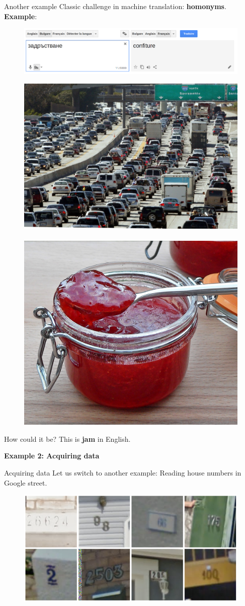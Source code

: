 \documentclass{beamer}
\begin{document}
\begin{frame}{Another example}
Classic challenge in machine translation: \textbf{homonyms}.
\vfill
\pause
\textbf{Example}:
\pause
\vfill
\begin{figure}
\centering
\includegraphics[width=\textwidth]{images/jam_google_translate.png}
\end{figure}
\pause
\vfill
\begin{figure}
\centering
\includegraphics[width=.45\textwidth]{images/traffic_jam.jpeg}~
\includegraphics[width=.4\textwidth]{images/jam.jpg}
\end{figure}
\pause
\vfill
How could it be? \pause This is \textbf{jam} in English.
\end{frame}

\begin{frame}
\center
\Huge
\textbf{Example 2: Acquiring data}
\end{frame}

\begin{frame}{Acquiring data}
Let us switch to another example: \pause Reading house numbers in Google street.
\pause
\vfill
\begin{figure}
\centering
\includegraphics[width=\textwidth]{images/street_numbers.png}
\end{figure}
\end{frame}
\end{document}
